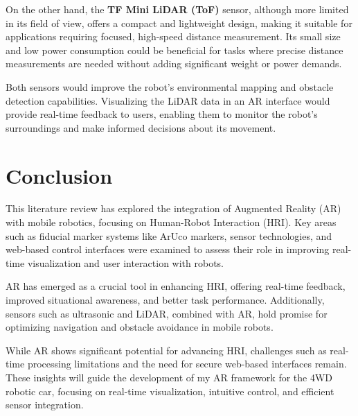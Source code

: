 On the other hand, the \textbf{TF Mini LiDAR (ToF)} sensor, although more limited in its field of view, offers a compact and lightweight design, making it suitable for applications requiring focused, high-speed distance measurement. Its small size and low power consumption could be beneficial for tasks where precise distance measurements are needed without adding significant weight or power demands.

Both sensors would improve the robot's environmental mapping and obstacle detection capabilities. Visualizing the LiDAR data in an AR interface would provide real-time feedback to users, enabling them to monitor the robot’s surroundings and make informed decisions about its movement.

\section{Conclusion}

This literature review has explored the integration of Augmented Reality (AR) with mobile robotics, focusing on Human-Robot Interaction (HRI). Key areas such as fiducial marker systems like ArUco markers, sensor technologies, and web-based control interfaces were examined to assess their role in improving real-time visualization and user interaction with robots.

AR has emerged as a crucial tool in enhancing HRI, offering real-time feedback, improved situational awareness, and better task performance. Additionally, sensors such as ultrasonic and LiDAR, combined with AR, hold promise for optimizing navigation and obstacle avoidance in mobile robots.

While AR shows significant potential for advancing HRI, challenges such as real-time processing limitations and the need for secure web-based interfaces remain. These insights will guide the development of my AR framework for the 4WD robotic car, focusing on real-time visualization, intuitive control, and efficient sensor integration.
